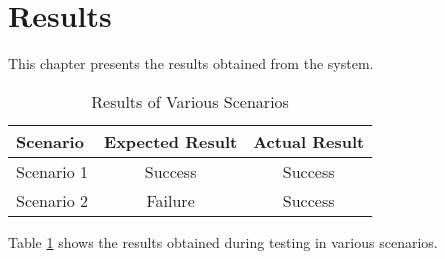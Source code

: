 \section{Results}

This chapter presents the results obtained from the system.

\begin{table}[h!]
    \centering
    \begin{tabular}{l c c}
        \toprule
        \textbf{Scenario} & \textbf{Expected Result} & \textbf{Actual Result} \\
        \midrule
        Scenario 1 & Success & Success \\
        Scenario 2 & Failure & Success \\
        \bottomrule
    \end{tabular}
    \caption{Results of Various Scenarios}
    \label{tab:results}
\end{table}

Table \ref{tab:results} shows the results obtained during testing in various scenarios.
